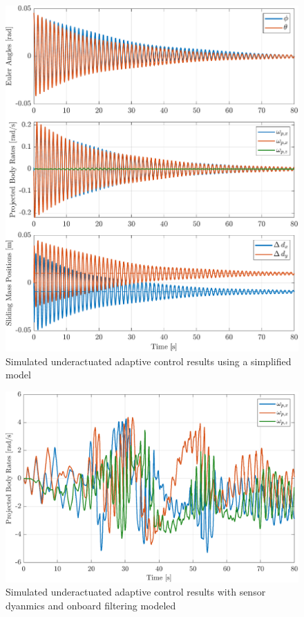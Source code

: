 \begin{figure}[!ht]
    \centering
    \includegraphics[width=\linewidth]{plots/adaptive_sim_success.pdf}
    \caption{Simulated underactuated adaptive control results using a simplified model}
    \label{fig:adaptive_sim_success}
\end{figure}

\begin{figure}[!ht]
    \centering
    \includegraphics[width=\linewidth]{plots/adaptive_sim_failure.pdf}
    \caption{Simulated underactuated adaptive control results with sensor dyanmics and onboard filtering modeled}
\end{figure}

